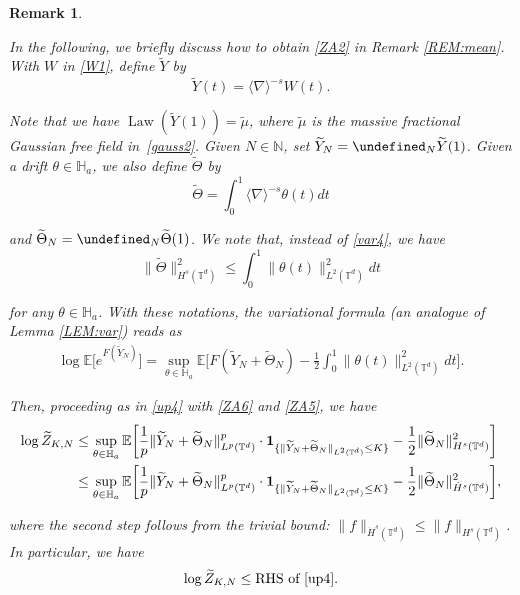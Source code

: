 \documentclass[letterpaper, 11pt,  reqno]{amsart}
\newtheorem{remark}[theorem]{Remark}
\newcommand{\noi}{\noindent}
\newcommand{\T}{\mathbb{T}}
\let\P= \undefined
\newcommand{\P}{\mathbf{P}}
\newcommand{\E}{\mathbb{E}}
\newcommand{\nb}{\nabla}
\newcommand{\wt}{\widetilde}
\newcommand{\ta}{\theta}
\newcommand{\jb}[1]
{\langle #1 \rangle}
\newcommand{\ind}{\mathbf 1}
\newcommand{\N}{\mathbb{N}}
\numberwithin{equation}{section}
\numberwithin{theorem}{section}
\DeclareMathOperator{\Law}{Law}
\newcommand{\dr}{\theta}
\newcommand{\Dr}{\Theta}
\newcommand{\Ha}{\mathbb{H}_a}
\begin{document}
\begin{remark}\label{REM:non1}\rm

In the following, we briefly discuss how to obtain
\eqref{ZA2}
in Remark \ref{REM:mean}.
With  $W$  in \eqref{W1}, 
define $\wt Y$ by 
\begin{equation*}
\wt Y (t) = \jb{\nb}^{- s} W (t).
\end{equation*}

\noi
Note that we have
$\Law (\wt Y (1)) = \wt \mu$,
where $\wt \mu$ is 
 the massive fractional Gaussian free field
in~\eqref{gauss2}.
Given $N \in \N$, set
$\wt Y_N = \P_{N} \wt Y (1)$.
Given a drift $\dr \in \Ha$, 
we also define
 $\wt \Dr $ by 
\begin{equation*}
\wt \Theta = \int_0^1 \jb{\nb}^{- s} \theta (t) dt
\end{equation*}


\noi
and $\wt \Dr_N = \P_N \wt \Dr(1) $.
We note that, 
instead of \eqref{var4}, 
we have 
\begin{equation}
\| \wt \Theta \|^2_{H^s (\mathbb{T}^d)}
\leq \int_0^1 \| \theta (t) \|^2_{L^2 (\mathbb{T}^d)} d t
\label{ZA5} 
\end{equation}

\noi
for any $\ta \in \Ha$.
With these notations, 
 the variational formula (an analogue of Lemma \ref{LEM:var})  reads as 
\begin{align}
\log\E \big[e^{F (\wt Y_N)}\big] = \sup_{\theta \in\Ha} 
\E \bigg[ F (\wt Y_N + \wt \Theta_N) - \frac{1}{2} \int_0^1\| \theta (t) \|^2_{L^2 (\mathbb{T}^d)} d t \bigg].
\label{ZA6} 
\end{align}

\noi
Then, 
proceeding as in \eqref{up4}
with 
\eqref{ZA6} and \eqref{ZA5}, 
we have 
\begin{align*}
\log  \wt Z_{K, N}
&  \le \sup_{\dr\in \mathbb{H}_a}\E\bigg[
\frac{1}{p}\|\wt Y_N+\wt \Dr_N\|^p_{L^p(\T^d)} \cdot 
\ind_{\{\|\wt Y_N+\wt \Dr_N\|_{L^2(\T^d)}\le K\}}-\frac{1}{2}\|\wt \Dr_N \|_{ H^s(\T^d)}^2\bigg]\notag \\
&  \le \sup_{\dr\in \mathbb{H}_a}\E\bigg[
\frac{1}{p}\|\wt Y_N+\wt \Dr_N\|^p_{L^p(\T^d)} \cdot 
\ind_{\{\|\wt Y_N+\wt \Dr_N\|_{L^2(\T^d)}\le K\}}-\frac{1}{2}\|\wt \Dr_N \|_{\dot  H^s(\T^d)}^2\bigg], 
\end{align*}


\noi
where the second step follows
from the trivial bound: $\|f\|_{\dot H^s(\T^d)}
\le \|f\|_{H^s(\T^d)}$.
In particular, 
we have
\begin{align*}
\log  \wt Z_{K, N} \le \text{RHS of } \eqref{up4}.
\end{align*}



\end{remark}
\end{document}
